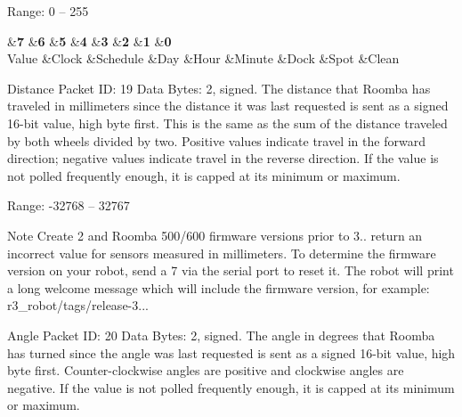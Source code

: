 \begin{Desc}
\begin{description}
Range\+: 0 – 255

\begin{TabularC}{9}
\hline
{}&{\bf 7 }&{\bf 6 }&{\bf 5 }&{\bf 4 }&{\bf 3 }&{\bf 2 }&{\bf 1 }&{\bf 0  }\\
Value &Clock &Schedule &Day &Hour &Minute &Dock &Spot &Clean \\
\end{TabularC}
\item[{\em 
\hypertarget{group__roomba-lib_gga46f008b5055c4a08d3123c6a3478373eab9db41437cc82100d3efb7579e6e2704}{}R\+O\+O\+M\+B\+A\+\_\+\+D\+I\+S\+T\+A\+N\+C\+E\label{group__roomba-lib_gga46f008b5055c4a08d3123c6a3478373eab9db41437cc82100d3efb7579e6e2704}
}]Distance Packet I\+D\+: 19 Data Bytes\+: 2, signed. The distance that Roomba has traveled in millimeters since the distance it was last requested is sent as a signed 16-\/bit value, high byte first. This is the same as the sum of the distance traveled by both wheels divided by two. Positive values indicate travel in the forward direction; negative values indicate travel in the reverse direction. If the value is not polled frequently enough, it is capped at its minimum or maximum.

Range\+: -\/32768 – 32767

\begin{DoxyNote}{Note}
Create 2 and Roomba 500/600 firmware versions prior to 3.. return an incorrect value for sensors measured in millimeters. To determine the firmware version on your robot, send a 7 via the serial port to reset it. The robot will print a long welcome message which will include the firmware version, for example\+: r3\+\_\+robot/tags/release-\/3... 
\end{DoxyNote}
\item[{\em 
\hypertarget{group__roomba-lib_gga46f008b5055c4a08d3123c6a3478373eae8c4ed6d765ba0bbe8a4d07824c4e7c1}{}R\+O\+O\+M\+B\+A\+\_\+\+A\+N\+G\+L\+E\label{group__roomba-lib_gga46f008b5055c4a08d3123c6a3478373eae8c4ed6d765ba0bbe8a4d07824c4e7c1}
}]Angle Packet I\+D\+: 20 Data Bytes\+: 2, signed. The angle in degrees that Roomba has turned since the angle was last requested is sent as a signed 16-\/bit value, high byte first. Counter-\/clockwise angles are positive and clockwise angles are negative. If the value is not polled frequently enough, it is capped at its minimum or maximum.


\end{description}
\end{Desc}
